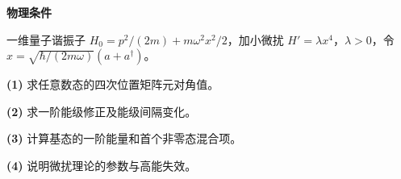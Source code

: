 \textbf{物理条件}\par 一维量子谐振子 \(H_0=p^2/(2m)+m\omega^2x^2/2\)，加小微扰 \(H'=\lambda x^4\)，\(\lambda>0\)，令 \(x=\sqrt{\hbar/(2m\omega)}(a+a^\dagger)\)。
\par\noindent\textbf{(1)} 求任意数态的四次位置矩阵元对角值。
\par\noindent\textbf{(2)} 求一阶能级修正及能级间隔变化。
\par\noindent\textbf{(3)} 计算基态的一阶能量和首个非零态混合项。
\par\noindent\textbf{(4)} 说明微扰理论的参数与高能失效。
